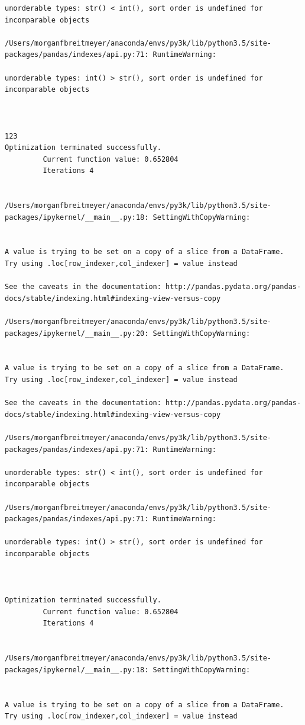 \begin{lstlisting}
unorderable types: str() < int(), sort order is undefined for incomparable objects

/Users/morganfbreitmeyer/anaconda/envs/py3k/lib/python3.5/site-packages/pandas/indexes/api.py:71: RuntimeWarning:

unorderable types: int() > str(), sort order is undefined for incomparable objects



123
Optimization terminated successfully.
         Current function value: 0.652804
         Iterations 4


/Users/morganfbreitmeyer/anaconda/envs/py3k/lib/python3.5/site-packages/ipykernel/__main__.py:18: SettingWithCopyWarning:


A value is trying to be set on a copy of a slice from a DataFrame.
Try using .loc[row_indexer,col_indexer] = value instead

See the caveats in the documentation: http://pandas.pydata.org/pandas-docs/stable/indexing.html#indexing-view-versus-copy

/Users/morganfbreitmeyer/anaconda/envs/py3k/lib/python3.5/site-packages/ipykernel/__main__.py:20: SettingWithCopyWarning:


A value is trying to be set on a copy of a slice from a DataFrame.
Try using .loc[row_indexer,col_indexer] = value instead

See the caveats in the documentation: http://pandas.pydata.org/pandas-docs/stable/indexing.html#indexing-view-versus-copy

/Users/morganfbreitmeyer/anaconda/envs/py3k/lib/python3.5/site-packages/pandas/indexes/api.py:71: RuntimeWarning:

unorderable types: str() < int(), sort order is undefined for incomparable objects

/Users/morganfbreitmeyer/anaconda/envs/py3k/lib/python3.5/site-packages/pandas/indexes/api.py:71: RuntimeWarning:

unorderable types: int() > str(), sort order is undefined for incomparable objects



Optimization terminated successfully.
         Current function value: 0.652804
         Iterations 4


/Users/morganfbreitmeyer/anaconda/envs/py3k/lib/python3.5/site-packages/ipykernel/__main__.py:18: SettingWithCopyWarning:


A value is trying to be set on a copy of a slice from a DataFrame.
Try using .loc[row_indexer,col_indexer] = value instead


\end{lstlisting}
